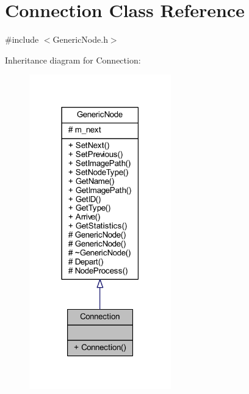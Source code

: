 \hypertarget{class_connection}{}\section{Connection Class Reference}
\label{class_connection}


{\ttfamily \#include $<$Generic\+Node.\+h$>$}



Inheritance diagram for Connection\+:
\nopagebreak
\begin{figure}[H]
\begin{center}
\leavevmode
\includegraphics[width=174pt]{class_connection__inherit__graph}
\end{center}
\end{figure}


